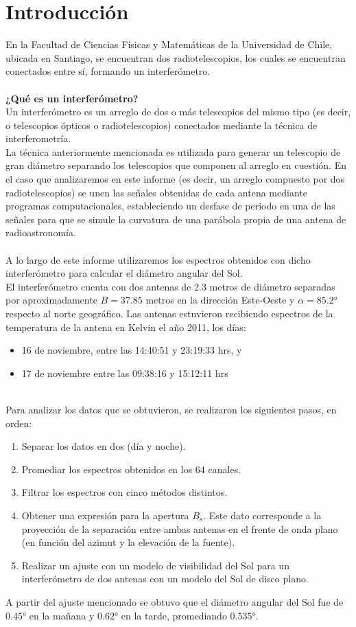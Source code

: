 \section{Introducción}
En la Facultad de Ciencias Físicas y Matemáticas de la Universidad de Chile, ubicada en Santiago, se encuentran dos radiotelescopios, los cuales se encuentran conectados entre sí, formando un interferómetro.\\
\\
\textbf{¿Qué es un interferómetro?}\\
Un interferómetro es un arreglo de dos o más telescopios del mismo tipo (es decir, o telescopios ópticos o radiotelescopios) conectados mediante la técnica de interferometría.\\
La técnica anteriormente mencionada es utilizada para generar un telescopio de gran diámetro separando los telescopios que componen al arreglo en cuestión. En el caso que analizaremos en este informe (es decir, un arreglo compuesto por dos radiotelescopios) se unen las señales obtenidas de cada antena mediante programas computacionales, estableciendo un desfase de periodo en una de las señales para que se simule la curvatura de una parábola propia de una antena de radioastronomía.\\
\\
A lo largo de este informe utilizaremos los espectros obtenidos con dicho interferómetro para calcular el diámetro angular del Sol.\\
El interferómetro cuenta con dos antenas de 2.3 metros de diámetro separadas por aproximadamente $B=37.85$ metros en la dirección Este-Oeste y $\alpha=85.2°$ respecto al norte geográfico. Las antenas estuvieron recibiendo espectros de la temperatura de la antena en Kelvin el año 2011, los días:
\begin{itemize}
    \item 16 de noviembre, entre las 14:40:51 y 23:19:33 hrs, y
    \item 17 de noviembre entre las 09:38:16 y 15:12:11 hrs
\end{itemize}
\\
Para analizar los datos que se obtuvieron, se realizaron los siguientes pasos, en orden:
\begin{enumerate}
    \item Separar los datos en dos (día y noche).
    \item Promediar los espectros obtenidos en los 64 canales.
    \item Filtrar los espectros con cinco métodos distintos.
    \item Obtener una expresión para la apertura $B_s$. Este dato corresponde a la proyección de la separación entre ambas antenas en el frente de onda plano (en función del azimut y la elevación de la fuente).
    \item Realizar un ajuste con un modelo de visibilidad del Sol para un interferómetro de dos antenas con un modelo del Sol de disco plano.
\end{enumerate}
A partir del ajuste mencionado se obtuvo que el diámetro angular del Sol fue de $0.45°$ en la mañana y $0.62°$ en la tarde, promediando $0.535°$.
\newpage

